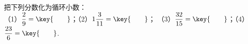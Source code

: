 把下列分数化为循环小数：\\
（1）$\dfrac {2}{9}=\key{\qquad}$；（2）$1\dfrac {3}{11}=\key{\qquad}$；
（3）$\dfrac {32}{15}=\key{\qquad}$；（4）$\dfrac {23}{6}=\key{\qquad}$.